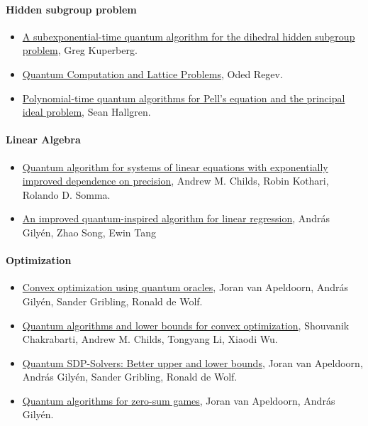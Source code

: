 \documentclass[12pt]{article}
\begin{document}
\paragraph*{Hidden subgroup problem}
\begin{itemize}
  \item \href{https://arxiv.org/abs/quant-ph/0302112}{A subexponential-time quantum algorithm for the dihedral hidden subgroup problem}, Greg Kuperberg.
  \item \href{https://arxiv.org/abs/cs/0304005}{Quantum Computation and Lattice Problems}, Oded Regev.
  \item \href{https://dl.acm.org/doi/10.1145/509907.510001}{Polynomial-time quantum algorithms for Pell's equation and the principal ideal problem}, Sean Hallgren.
\end{itemize}

\paragraph*{Linear Algebra}
\begin{itemize}
  \item \href{https://arxiv.org/abs/1511.02306}{Quantum algorithm for systems of linear equations with exponentially improved dependence on precision}, Andrew M. Childs, Robin Kothari, Rolando D. Somma.
  \item \href{https://arxiv.org/abs/2009.07268}{An improved quantum-inspired algorithm for linear regression}, Andr\'{a}s Gily\'{e}n, Zhao Song, Ewin Tang
\end{itemize}

\paragraph*{Optimization}
\begin{itemize}
  \item \href{https://arxiv.org/abs/1809.00643}{Convex optimization using quantum oracles}, Joran van Apeldoorn, Andr\'{a}s Gily\'{e}n, Sander Gribling, Ronald de Wolf.
  \item \href{https://arxiv.org/abs/1809.01731}{Quantum algorithms and lower bounds for convex optimization}, Shouvanik Chakrabarti, Andrew M. Childs, Tongyang Li, Xiaodi Wu.
  \item \href{https://arxiv.org/abs/1705.01843}{Quantum SDP-Solvers: Better upper and lower bounds}, Joran van Apeldoorn, András Gilyén, Sander Gribling, Ronald de Wolf.
  \item \href{https://arxiv.org/abs/1904.03180}{Quantum algorithms for zero-sum games}, Joran van Apeldoorn, Andr\'{a}s Gily\'{e}n.
\end{itemize}
\end{document}
